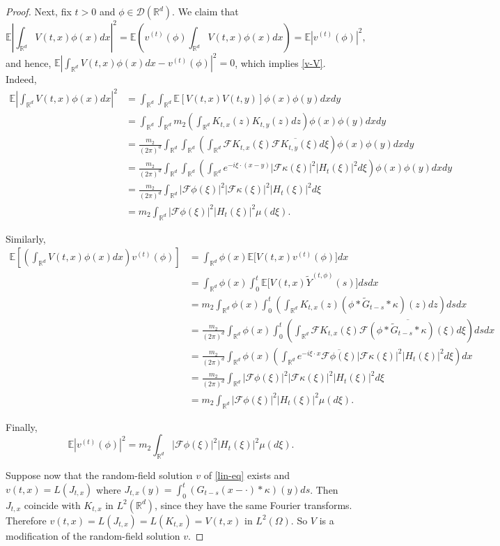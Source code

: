 \documentclass[12pt]{article}
\def\cF{\mathcal{F}}
\def\bE{\mathbb{E}}
\def\bR{\mathbb{R}}
\def\k{\kappa}
\begin{document}
\begin{proof}
Next, fix $t>0$ and $\phi\in \mathcal D(\bR^d)$. We claim that
\[
\mathbb E\left|\int_{\bR^d}V(t,x)\phi(x)dx\right|^2
=
\mathbb E\left(v^{(t)}(\phi)\int_{\bR^d}V(t,x)\phi(x)dx\right)
=
\mathbb E|v^{(t)}(\phi)|^2,
\]
and hence,
$\bE\left|
\int_{\bR^d}V(t,x)\phi(x)dx-v^{(t)}(\phi)
\right|^2=0$, which implies \eqref{v-V}.
Indeed,
\begin{align*}
\mathbb E\left| \int_{\bR^d}V(t,x)\phi(x)dx \right|^2
&= \int_{\bR^d}\int_{\bR^d} \mathbb E\left[V(t,x)V(t,y)\right]\phi(x)\phi(y)dxdy\\
&= \int_{\bR^d}\int_{\bR^d}
m_2\left(\int_{\bR^d}K_{t,x}(z)K_{t,y}(z)dz\right)\phi(x)\phi(y)dxdy\\
&= \frac{m_2}{(2\pi)^d}
\int_{\bR^d}\int_{\bR^d}
\left(\int_{\bR^d}\cF K_{t,x}(\xi)\overline{\cF K_{t,y}(\xi)}d\xi\right)
\phi(x)\phi(y)dxdy\\
&= \frac{m_2}{(2\pi)^d}
\int_{\bR^d}\int_{\bR^d}
\left(\int_{\bR^d}
e^{-i\xi\cdot(x-y)}
|\cF\k(\xi)|^2|H_t(\xi)|^2d\xi\right)
\phi(x)\phi(y)dxdy\\
&= \frac{m_2}{(2\pi)^d}
\int_{\bR^d}
|\cF\phi(\xi)|^2|\cF\k(\xi)|^2|H_t(\xi)|^2d\xi\\
&= m_2\int_{\bR^d}
|\cF\phi(\xi)|^2|H_t(\xi)|^2\mu(d\xi).
\end{align*}

Similarly,
\begin{align*}
\mathbb E\left[\left(\int_{\bR^d}V(t,x)\phi(x)dx\right)v^{(t)}(\phi)\right]
&= \int_{\bR^d}\phi(x)\mathbb E\big[V(t,x)v^{(t)}(\phi)\big]dx\\
&= \int_{\bR^d}\phi(x)\int_0^t
\mathbb E\big[V(t,x)\widetilde Y^{(t,\phi)}(s)\big]dsdx\\
&= m_2\int_{\bR^d}\phi(x)\int_0^t
\left(\int_{\bR^d}K_{t,x}(z)(\phi*\widetilde G_{t-s}*\k)(z)dz\right)dsdx\\
&= \frac{m_2}{(2\pi)^d}\int_{\bR^d}\phi(x)\int_0^t
\left(\int_{\bR^d}
\cF K_{t,x}(\xi)
\overline{\cF(\phi*\widetilde G_{t-s}*\k)(\xi)}
d\xi\right)dsdx\\
&= \frac{m_2}{(2\pi)^d}\int_{\bR^d}\phi(x)
\left(\int_{\bR^d}
e^{-i\xi\cdot x}\overline{\cF\phi(\xi)}
|\cF\k(\xi)|^2|H_t(\xi)|^2
d\xi\right)dx\\
&= \frac{m_2}{(2\pi)^d}\int_{\bR^d}
|\cF\phi(\xi)|^2|\cF\k(\xi)|^2|H_t(\xi)|^2d\xi\\
&= m_2\int_{\bR^d}
|\cF\phi(\xi)|^2|H_t(\xi)|^2\mu(d\xi).
\end{align*}

Finally,
\[
\mathbb E|v^{(t)}(\phi)|^2
=
m_2\int_{\bR^d}
|\cF\phi(\xi)|^2|H_t(\xi)|^2\mu(d\xi).
\]

Suppose now that the random-field solution $v$ of \eqref{lin-eq} exists and  $v(t,x)=L(J_{t,x})$ where
$J_{t,x}(y)=\int_0^t (G_{t-s}(x-\cdot)*\k)(y)ds$.
Then $J_{t,x}$ coincide with $K_{t,x}$ in $L^2(\bR^d)$, since they have the same Fourier transforms. Therefore
$v(t,x)=L(J_{t,x})=L(K_{t,x})=V(t,x)$ in $L^2(\Omega)$.
So $V$ is a modification of the random-field solution $v$.
\end{proof}
\end{document}

